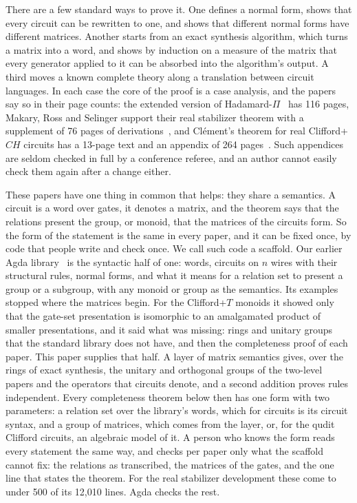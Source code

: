 There are a few standard ways to prove it. One defines a normal form,
shows that every circuit can be rewritten to one, and shows that
different normal forms have different matrices. Another starts from an
exact synthesis algorithm, which turns a matrix into a word, and shows
by induction on a measure of the matrix that every generator applied to
it can be absorbed into the algorithm's output. A third moves a known
complete theory along a translation between circuit languages. In each
case the core of the proof is a case analysis, and the papers say so
in their page counts: the extended version of
Hadamard-$\Pi$~\cite{fang2026hadamard} has 116 pages, Makary, Ross and
Selinger support their real stabilizer theorem with a supplement of 76
pages of derivations~\cite{makary2021real}, and Cl\'ement's theorem
for real Clifford+$CH$ circuits has a 13-page text and an appendix of
264 pages~\cite{clement2026realcliffordch}. Such appendices are seldom
checked in full by a conference referee, and an author cannot easily
check them again after a change either.

These papers have one thing in common that helps: they share a
semantics. A circuit is a word over gates, it denotes a matrix, and the
theorem says that the relations present the group, or monoid, that the
matrices of the circuits form. So the form of the statement is the same
in every paper, and it can be fixed once, by code that people write and
check once. We call such code a scaffold. Our earlier Agda
library~\cite{anonymous2027popl} is the syntactic half of one: words,
circuits on $n$ wires with their structural rules, normal forms, and
what it means for a relation set to present a group or a subgroup, with
any monoid or group as the semantics. Its examples stopped where the
matrices begin. For the Clifford+$T$ monoids it showed only that the
gate-set presentation is isomorphic to an amalgamated product of
smaller presentations, and it said what was missing: rings and unitary
groups that the standard library does not have, and then the
completeness proof of each paper. This paper supplies that half. A
layer of matrix semantics gives, over the rings of exact synthesis, the
unitary and orthogonal groups of the two-level papers and the operators
that circuits denote, and a second addition proves rules independent.
Every completeness theorem below then has one form with two
parameters: a relation set over the library's words, which for
circuits is its circuit syntax, and a group of matrices, which comes
from the layer, or, for the qudit Clifford circuits, an algebraic model
of it. A person who knows the form reads every statement the same way,
and checks per paper only what the scaffold cannot fix: the relations
as transcribed, the matrices of the gates, and the one line that states
the theorem. For the real stabilizer development these come to under
500 of its 12{,}010 lines. Agda checks the rest.

